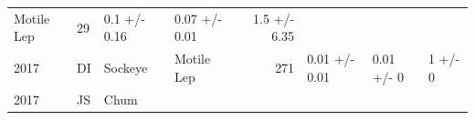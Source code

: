 \documentclass[fleqn,10pt]{wlpeerj} %
\begin{document}
\begin{longtable}[]{@{}llllrlll@{}}
\begin{minipage}[t]{0.11\columnwidth}
Motile Lep\strut
\end{minipage} & \begin{minipage}[t]{0.04\columnwidth}\raggedleft\strut
29\strut
\end{minipage} & \begin{minipage}[t]{0.14\columnwidth}\raggedright\strut
0.1 +/- 0.16\strut
\end{minipage} & \begin{minipage}[t]{0.14\columnwidth}\raggedright\strut
0.07 +/- 0.01\strut
\end{minipage} & \begin{minipage}[t]{0.14\columnwidth}\raggedright\strut
1.5 +/- 6.35\strut
\end{minipage}\tabularnewline
\begin{minipage}[t]{0.09\columnwidth}\raggedright\strut
2017\strut
\end{minipage} & \begin{minipage}[t]{0.06\columnwidth}\raggedright\strut
DI\strut
\end{minipage} & \begin{minipage}[t]{0.06\columnwidth}\raggedright\strut
Sockeye\strut
\end{minipage} & \begin{minipage}[t]{0.11\columnwidth}\raggedright\strut
Motile Lep\strut
\end{minipage} & \begin{minipage}[t]{0.04\columnwidth}\raggedleft\strut
271\strut
\end{minipage} & \begin{minipage}[t]{0.14\columnwidth}\raggedright\strut
0.01 +/- 0.01\strut
\end{minipage} & \begin{minipage}[t]{0.14\columnwidth}\raggedright\strut
0.01 +/- 0\strut
\end{minipage} & \begin{minipage}[t]{0.14\columnwidth}\raggedright\strut
1 +/- 0\strut
\end{minipage}\tabularnewline
\begin{minipage}[t]{0.09\columnwidth}\raggedright\strut
2017\strut
\end{minipage} & \begin{minipage}[t]{0.06\columnwidth}\raggedright\strut
JS\strut
\end{minipage} & \begin{minipage}[t]{0.06\columnwidth}\raggedright\strut
Chum\strut
\end{minipage} & \begin{minipage}[t]{0.11\columnwidth}\raggedright\strut

\end{minipage}
\end{longtable}
\end{document}
